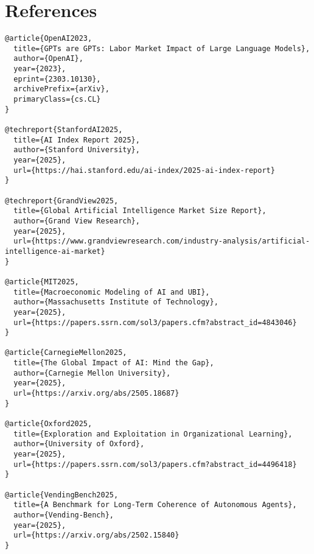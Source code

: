 \documentclass[11pt]{amsart}
\begin{document}
\hypertarget{x-references}{\section{References}}
\begin{verbatim}
@article{OpenAI2023,
  title={GPTs are GPTs: Labor Market Impact of Large Language Models},
  author={OpenAI},
  year={2023},
  eprint={2303.10130},
  archivePrefix={arXiv},
  primaryClass={cs.CL}
}

@techreport{StanfordAI2025,
  title={AI Index Report 2025},
  author={Stanford University},
  year={2025},
  url={https://hai.stanford.edu/ai-index/2025-ai-index-report}
}

@techreport{GrandView2025,
  title={Global Artificial Intelligence Market Size Report},
  author={Grand View Research},
  year={2025},
  url={https://www.grandviewresearch.com/industry-analysis/artificial-intelligence-ai-market}
}

@article{MIT2025,
  title={Macroeconomic Modeling of AI and UBI},
  author={Massachusetts Institute of Technology},
  year={2025},
  url={https://papers.ssrn.com/sol3/papers.cfm?abstract_id=4843046}
}

@article{CarnegieMellon2025,
  title={The Global Impact of AI: Mind the Gap},
  author={Carnegie Mellon University},
  year={2025},
  url={https://arxiv.org/abs/2505.18687}
}

@article{Oxford2025,
  title={Exploration and Exploitation in Organizational Learning},
  author={University of Oxford},
  year={2025},
  url={https://papers.ssrn.com/sol3/papers.cfm?abstract_id=4496418}
}

@article{VendingBench2025,
  title={A Benchmark for Long-Term Coherence of Autonomous Agents},
  author={Vending-Bench},
  year={2025},
  url={https://arxiv.org/abs/2502.15840}
}
\end{verbatim}
\end{document}
